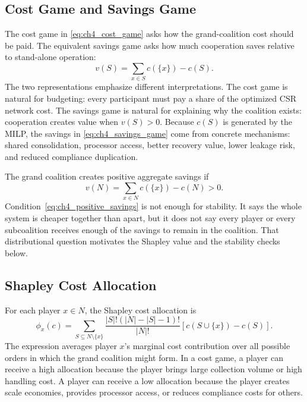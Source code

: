 \subsection{Cost Game and Savings Game}

The cost game in \eqref{eq:ch4_cost_game} asks how the grand-coalition cost should be paid. The equivalent savings game asks how much cooperation saves relative to stand-alone operation:
\begin{equation}
\label{eq:ch4_savings_game}
v(S)=\sum_{x\in S}c(\{x\})-c(S).
\end{equation}
The two representations emphasize different interpretations. The cost game is natural for budgeting: every participant must pay a share of the optimized CSR network cost. The savings game is natural for explaining why the coalition exists: cooperation creates value when $v(S)>0$. Because $c(S)$ is generated by the MILP, the savings in \eqref{eq:ch4_savings_game} come from concrete mechanisms: shared consolidation, processor access, better recovery value, lower leakage risk, and reduced compliance duplication.

The grand coalition creates positive aggregate savings if
\begin{equation}
\label{eq:ch4_positive_savings}
v(N)=\sum_{x\in N}c(\{x\})-c(N)>0.
\end{equation}
Condition~\eqref{eq:ch4_positive_savings} is not enough for stability. It says the whole system is cheaper together than apart, but it does not say every player or every subcoalition receives enough of the savings to remain in the coalition. That distributional question motivates the Shapley value and the stability checks below.

\subsection{Shapley Cost Allocation}

For each player $x\in N$, the Shapley cost allocation is
\begin{equation}
\label{eq:shapley}
\phi_x(c)=
\sum_{S\subseteq N\setminus\{x\}}
\frac{|S|!(|N|-|S|-1)!}{|N|!}
\left[c(S\cup\{x\})-c(S)\right].
\end{equation}
The expression averages player $x$'s marginal cost contribution over all possible orders in which the grand coalition might form. In a cost game, a player can receive a high allocation because the player brings large collection volume or high handling cost. A player can receive a low allocation because the player creates scale economies, provides processor access, or reduces compliance costs for others.

